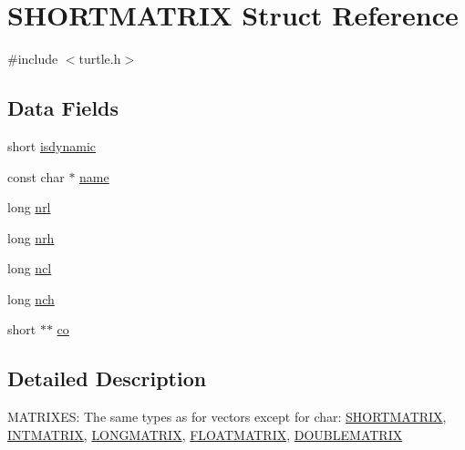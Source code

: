 \hypertarget{struct_s_h_o_r_t_m_a_t_r_i_x}{\section{S\-H\-O\-R\-T\-M\-A\-T\-R\-I\-X Struct Reference}
\label{struct_s_h_o_r_t_m_a_t_r_i_x}
}


{\ttfamily \#include $<$turtle.\-h$>$}

\subsection*{Data Fields}
\begin{DoxyCompactItemize}
\item 
short \hyperlink{struct_s_h_o_r_t_m_a_t_r_i_x_aac64a80e3baae1513a4837f79a6dc344}{isdynamic}
\item 
const char $\ast$ \hyperlink{struct_s_h_o_r_t_m_a_t_r_i_x_a65f0dbe245bdbac3a531d9bb628a3fc4}{name}
\item 
long \hyperlink{struct_s_h_o_r_t_m_a_t_r_i_x_aa7432b4b900beac6e59f54734339f272}{nrl}
\item 
long \hyperlink{struct_s_h_o_r_t_m_a_t_r_i_x_ad9f8f6fb48d28831fe8f014d6d65113c}{nrh}
\item 
long \hyperlink{struct_s_h_o_r_t_m_a_t_r_i_x_a8fd36d908f8120a9da49b7d6576e7fce}{ncl}
\item 
long \hyperlink{struct_s_h_o_r_t_m_a_t_r_i_x_a14590f75e55c07c6e462c78d1645c7c8}{nch}
\item 
short $\ast$$\ast$ \hyperlink{struct_s_h_o_r_t_m_a_t_r_i_x_a245df1fe191ac8b924ca87409c637573}{co}
\end{DoxyCompactItemize}


\subsection{Detailed Description}




M\-A\-T\-R\-I\-X\-E\-S\-: The same types as for vectors except for char\-: \hyperlink{struct_s_h_o_r_t_m_a_t_r_i_x}{S\-H\-O\-R\-T\-M\-A\-T\-R\-I\-X}, \hyperlink{struct_i_n_t_m_a_t_r_i_x}{I\-N\-T\-M\-A\-T\-R\-I\-X}, \hyperlink{struct_l_o_n_g_m_a_t_r_i_x}{L\-O\-N\-G\-M\-A\-T\-R\-I\-X}, \hyperlink{struct_f_l_o_a_t_m_a_t_r_i_x}{F\-L\-O\-A\-T\-M\-A\-T\-R\-I\-X}, \hyperlink{struct_d_o_u_b_l_e_m_a_t_r_i_x}{D\-O\-U\-B\-L\-E\-M\-A\-T\-R\-I\-X} 

 

